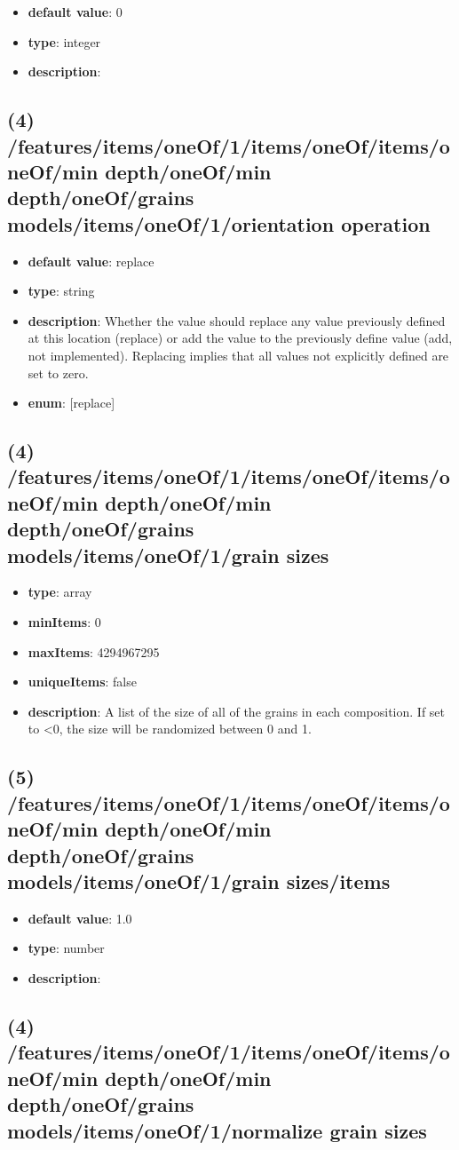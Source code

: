 \begin{itemize}[leftmargin=5em]\item {\bf default value}: 0
\item {\bf type}: integer
\item {\bf description}: 
\end{itemize}\subsection{(4) /features/items/oneOf/1/items/oneOf/items/oneOf/min depth/oneOf/min depth/oneOf/grains models/items/oneOf/1/orientation operation}
\begin{itemize}[leftmargin=4em]\item {\bf default value}: replace
\item {\bf type}: string
\item {\bf description}: Whether the value should replace any value previously defined at this location (replace) or add the value to the previously define value (add, not implemented). Replacing implies that all values not explicitly defined are set to zero.
\item {\bf enum}: [replace]\end{itemize}\subsection{(4) /features/items/oneOf/1/items/oneOf/items/oneOf/min depth/oneOf/min depth/oneOf/grains models/items/oneOf/1/grain sizes}
\begin{itemize}[leftmargin=4em]\item {\bf type}: array
\item {\bf minItems}: 0
\item {\bf maxItems}: 4294967295
\item {\bf uniqueItems}: false
\item {\bf description}: A list of the size of all of the grains in each composition. If set to <0, the size will be randomized between 0 and 1.
\end{itemize}\subsection{(5) /features/items/oneOf/1/items/oneOf/items/oneOf/min depth/oneOf/min depth/oneOf/grains models/items/oneOf/1/grain sizes/items}
\begin{itemize}[leftmargin=5em]\item {\bf default value}: 1.0
\item {\bf type}: number
\item {\bf description}: 
\end{itemize}\subsection{(4) /features/items/oneOf/1/items/oneOf/items/oneOf/min depth/oneOf/min depth/oneOf/grains models/items/oneOf/1/normalize grain sizes}
